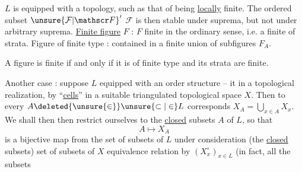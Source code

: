 $L$ is equipped with a topology, such as that of being \uline{locally} finite. The ordered
subset ${\unsure{\mathcal F|\mathscr F}}'$  $\mathcal F$ is then stable under  suprema, but not   under arbitrary
suprema. \uline{Finite figure} $F$ :  $F$ finite in the ordinary sense, i.e. a finite  of strata. Figure of finite type : contained
in a finite union of subfigures $F_A$.

 A figure is  finite  if and only if it is of finite type and its strata are finite.

Another case : suppose $L$ equipped with an order structure -- it  in a topological realization, by ``\uline{cells}''  in a suitable
triangulated topological space $X$. Then to every $A\deleted{\unsure{\in}}\unsure{\subset|\in}L$ corresponds  $X_A=\bigcup_{x\in A}X_x$.
We shall then then restrict ourselves to the \uline{closed} subsets $A$ of $L$, so that
\[ A\longmapsto X_A \]
is a bijective map from the set of subsets of $L$ under consideration (the \uline{closed} subsets)
 set of  subsets of $X$    equivalence relation  by  $(X_x^\circ)_{x\in L}$ (in fact, all the subsets
